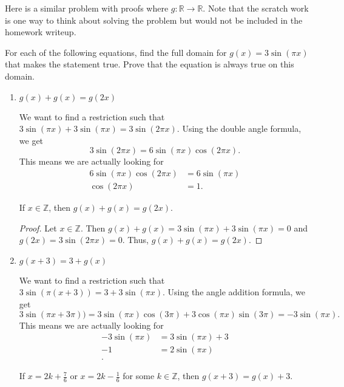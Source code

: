 \documentclass{ximera}
\begin{document}
Here is a similar problem with proofs where $g:\mathbb{R}\to\mathbb{R}$. Note that the scratch work is one way to think about solving the problem but would not be included in the homework writeup.

\begin{example}
 For each of the following equations, find the full domain for $g(x)=3\sin(\pi x)$ that
 makes the statement true. Prove that the equation is always true on this domain. 
	\begin{enumerate}
 		\item $g( x ) + g( x ) =g( 2x)$
		
		\begin{scratch}
		We want to find a restriction such that $3\sin(\pi x)+3\sin(\pi x)=3\sin(2\pi x)$. Using the double angle formula, we get \[3\sin(2\pi x)=6\sin(\pi x)\cos(2\pi x).\] This means we are actually looking for 
			\begin{align*}
 				6\sin(\pi x)\cos(2\pi x)&=6\sin(\pi x)\\
				\cos(2\pi x)&=1.
			\end{align*}
		\end{scratch}

		\begin{solution}
 		If $x\in\mathbb{Z}$, then $g(x)+g(x)=g(2 x)$.
 
		\begin{proof}
 		Let $x\in\mathbb{Z}$. Then $g(x)+g(x)=3\sin(\pi x)+3\sin(\pi x)=0$ and $g(2x)=3\sin(2\pi x)=0$. Thus, $g(x)+g(x)=g(2 x)$.
		\end{proof}
		\end{solution}

		\item $g( x + 3 )  = 3 +g( x)$
		
		\begin{scratch}
 			We want to find a restriction such that $3\sin(\pi (x+3))=3+3\sin(\pi x)$.
			Using the angle addition formula, we get 
			\[3\sin(\pi x+3\pi))=3\sin(\pi x)\cos(3\pi) +3\cos(\pi x)\sin(3\pi)=-3\sin(\pi x).\] This means we are actually looking for 
			\begin{align*}
 				-3\sin(\pi x)&=3\sin(\pi x)+3\\
				-1&=2\sin(\pi x)\\.
			\end{align*}
		\end{scratch}
		
		
		\begin{solution}
 		If $x=2k+\frac{7}{6}$ or $x=2k-\frac{1}{6}$ for some $k\in\mathbb{Z}$, then $g (x+3)=g(x)+3.$
		

\end{solution}
\end{enumerate}
\end{example}
\end{document}
